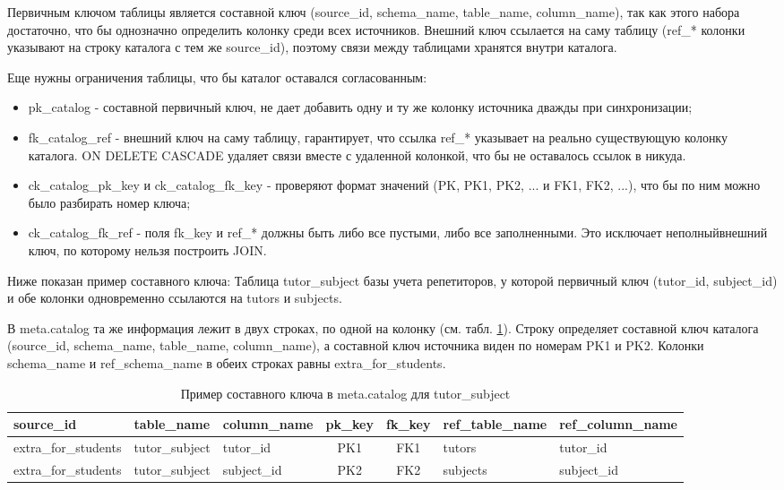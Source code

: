 \documentclass[areasetadvanced]{scrartcl}
\begin{document}
Первичным ключом таблицы является составной ключ (source\_id, schema\_name, table\_name, column\_name), так как этого набора достаточно, что бы однозначно определить колонку среди всех источников. 
Внешний ключ ссылается на саму таблицу (ref\_* колонки указывают на строку каталога с тем же source\_id), 
поэтому связи между таблицами хранятся внутри каталога.

Еще нужны ограничения таблицы, что бы каталог оставался согласованным:
\begin{itemize}
    \item pk\_catalog - составной первичный ключ, не дает добавить одну и ту же колонку источника дважды при синхронизации;
    \item fk\_catalog\_ref - внешний ключ на саму таблицу, гарантирует, что ссылка ref\_* указывает на реально существующую колонку каталога. 
    ON DELETE CASCADE удаляет связи вместе с удаленной колонкой, что бы не оставалось ссылок в никуда.
    \item ck\_catalog\_pk\_key и ck\_catalog\_fk\_key - проверяют формат значений (PK, PK1, PK2, ... и FK1, FK2, ...), что бы по ним можно было разбирать номер ключа;
    \item ck\_catalog\_fk\_ref - поля fk\_key и ref\_* должны быть либо все пустыми, либо все заполненными. Это исключает \guillemetleft неполный\guillemetright внешний ключ, по которому нельзя построить JOIN.
\end{itemize}

Ниже показан пример составного ключа:
Таблица tutor\_subject базы учета репетиторов, у которой первичный ключ (tutor\_id, subject\_id) и обе колонки
одновременно ссылаются на tutors и subjects.

В meta.catalog та же информация лежит в двух строках, по одной на колонку (см. табл. \ref{tab:catalog_example}). Строку определяет
составной ключ каталога (source\_id, schema\_name, table\_name, column\_name), а составной ключ источника виден по номерам PK1 и PK2.
Колонки schema\_name и ref\_schema\_name в обеих строках равны extra\_for\_students.

\begin{table}[H]
    \centering
    \small
    \caption{Пример составного ключа в meta.catalog для tutor\_subject}
    \label{tab:catalog_example}
    \begin{tabular}{|l|l|l|c|c|l|l|}
        \hline
        source\_id & table\_name & column\_name & pk\_key & fk\_key & ref\_table\_name & ref\_column\_name \\ \hline
        extra\_for\_students & tutor\_subject & tutor\_id & PK1 & FK1 & tutors & tutor\_id \\ \hline
        extra\_for\_students & tutor\_subject & subject\_id & PK2 & FK2 & subjects & subject\_id \\ \hline
    \end{tabular}
\end{table}
\end{document}
